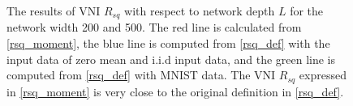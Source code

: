 \begin{figure}[h]
\centering
\newcommand{\myWidth}{0.48\textwidth}
% 

\caption{
The results of VNI $R_{sq}$ with respect to network depth $L$ for the network width 200 and 500. The red line is calculated from \eqref{rsq_moment}, the blue line is computed from \eqref{rsq_def} with the input data of zero mean and i.i.d input data, and the green line is computed from \eqref{rsq_def} with MNIST data.
The VNI $R_{sq}$ expressed in \eqref{rsq_moment} is very close to the original definition in \eqref{rsq_def}.
}
\label{fig:sec4_sim2}
\end{figure}

